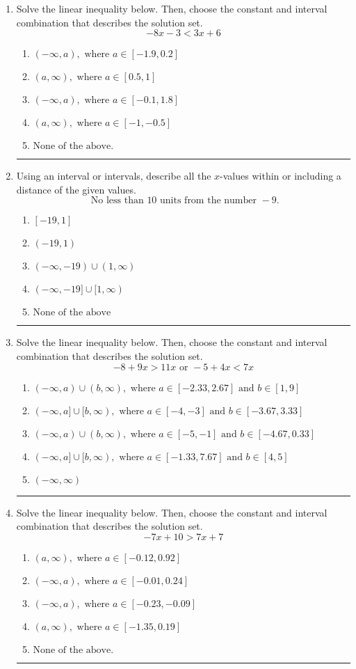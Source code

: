 \documentclass[14pt]{extbook}
\newcommand{\litem}[1]{\item#1\hspace*{-1cm}\rule{\textwidth}{0.4pt}}
\begin{document}
\begin{enumerate}
\litem{
Solve the linear inequality below. Then, choose the constant and interval combination that describes the solution set.\[ -8x -3 < 3x + 6 \]\begin{enumerate}[label=\Alph*.]
\item \( (-\infty, a), \text{ where } a \in [-1.9, 0.2] \)
\item \( (a, \infty), \text{ where } a \in [0.5, 1] \)
\item \( (-\infty, a), \text{ where } a \in [-0.1, 1.8] \)
\item \( (a, \infty), \text{ where } a \in [-1, -0.5] \)
\item \( \text{None of the above}. \)

\end{enumerate} }
\litem{
Using an interval or intervals, describe all the $x$-values within or including a distance of the given values.\[ \text{ No less than } 10 \text{ units from the number } -9. \]\begin{enumerate}[label=\Alph*.]
\item \( [-19, 1] \)
\item \( (-19, 1) \)
\item \( (-\infty, -19) \cup (1, \infty) \)
\item \( (-\infty, -19] \cup [1, \infty) \)
\item \( \text{None of the above} \)

\end{enumerate} }
\litem{
Solve the linear inequality below. Then, choose the constant and interval combination that describes the solution set.\[ -8 + 9 x > 11 x \text{ or } -5 + 4 x < 7 x \]\begin{enumerate}[label=\Alph*.]
\item \( (-\infty, a) \cup (b, \infty), \text{ where } a \in [-2.33, 2.67] \text{ and } b \in [1, 9] \)
\item \( (-\infty, a] \cup [b, \infty), \text{ where } a \in [-4, -3] \text{ and } b \in [-3.67, 3.33] \)
\item \( (-\infty, a) \cup (b, \infty), \text{ where } a \in [-5, -1] \text{ and } b \in [-4.67, 0.33] \)
\item \( (-\infty, a] \cup [b, \infty), \text{ where } a \in [-1.33, 7.67] \text{ and } b \in [4, 5] \)
\item \( (-\infty, \infty) \)

\end{enumerate} }
\litem{
Solve the linear inequality below. Then, choose the constant and interval combination that describes the solution set.\[ -7x + 10 > 7x + 7 \]\begin{enumerate}[label=\Alph*.]
\item \( (a, \infty), \text{ where } a \in [-0.12, 0.92] \)
\item \( (-\infty, a), \text{ where } a \in [-0.01, 0.24] \)
\item \( (-\infty, a), \text{ where } a \in [-0.23, -0.09] \)
\item \( (a, \infty), \text{ where } a \in [-1.35, 0.19] \)
\item \( \text{None of the above}. \)


\end{enumerate}}
\end{enumerate}
\end{document}
